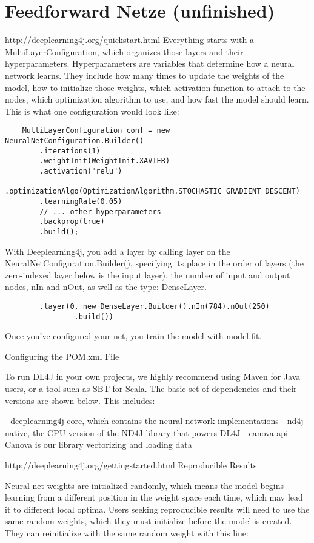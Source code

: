 {\section{Feedforward Netze (unfinished)}
http://deeplearning4j.org/quickstart.html
Everything starts with a MultiLayerConfiguration, which organizes those layers and their hyperparameters.
Hyperparameters are variables that determine how a neural network learns. They include how many times to update the weights of the model, how to initialize those weights, which activation function to attach to the nodes, which optimization algorithm to use, and how fast the model should learn. This is what one configuration would look like:
\begin{lstlisting}
    MultiLayerConfiguration conf = new NeuralNetConfiguration.Builder()
        .iterations(1)
        .weightInit(WeightInit.XAVIER)
        .activation("relu")
        .optimizationAlgo(OptimizationAlgorithm.STOCHASTIC_GRADIENT_DESCENT)
        .learningRate(0.05)
        // ... other hyperparameters
        .backprop(true)
        .build();
\end{lstlisting}
With Deeplearning4j, you add a layer by calling layer on the NeuralNetConfiguration.Builder(), specifying its place in the order of layers (the zero-indexed layer below is the input layer), the number of input and output nodes, nIn and nOut, as well as the type: DenseLayer.
\begin{lstlisting}
        .layer(0, new DenseLayer.Builder().nIn(784).nOut(250)
                .build())
\end{lstlisting}
Once you’ve configured your net, you train the model with model.fit.

Configuring the POM.xml File

To run DL4J in your own projects, we highly recommend using Maven for Java users, or a tool such as SBT for Scala. The basic set of dependencies and their versions are shown below. This includes:

   -  deeplearning4j-core, which contains the neural network implementations
   -  nd4j-native, the CPU version of the ND4J library that powers DL4J
    - canova-api - Canova is our library vectorizing and loading data

http://deeplearning4j.org/gettingstarted.html
Reproducible Results

Neural net weights are initialized randomly, which means the model begins learning from a different position in the weight space each time, which may lead it to different local optima. Users seeking reproducible results will need to use the same random weights, which they must initialize before the model is created. They can reinitialize with the same random weight with this line:

}
